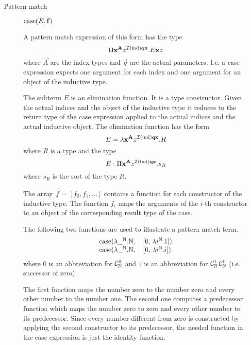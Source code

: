 \begin{description}
\item[Pattern match]
    $\text{case}(E, \mathbf{f})$

    A pattern match expression of this form has the type
    $$
    \Pi
        \mathbf{x}^{\mathbf{A}}
        z^{{\cal I }(\text{ind})\mathbf{q}\mathbf{x}}
        . E \mathbf{x} z
    $$
    where $\vec{A}$ are the index types and $\vec{q}$ are the actual parameters.
    I.e. a case
    expression expects one argument for each index and one argument for an
    object of the inductive type.

    The subterm $E$ is an elimination function. It is a type constructor. Given
    the actual indices and the object of the inductive type it reduces to the
    return type of the case expression applied to the actual indices and the
    actual inductive object. The elimination function has the form
    $$
        E
        =
        \lambda \mathbf{x}^{\mathbf{A}} z^{{\cal I } (\text{ind}) \mathbf{q} \mathbf{x}}. R
    $$
    where $R$ is a type and the type
    $$
        E
        :
        \Pi \mathbf{x}^{\mathbf{A}} z^{{\cal I } (\text{ind}) \mathbf{q} \mathbf{x}}. s_R
    $$
    where $s_R$ is the sort of the type $R$.


    The array $\vec{f} = [f_0, f_1, \ldots]$ contains a function for each
    constructor of the inductive type. The function $f_i$ maps the arguments of
    the $i$-th constructor to an object of the corresponding result type of the
    case.

    The following two functions are used to illustrate a pattern match term.
    {\def\Nat{\mathbb{N}}
      $$
      \begin{array}{l}
          \case ( \lambda \_^\Nat. \Nat,\quad [ 0 ,\, \lambda i^\Nat. 1])

          \\

          \case (\lambda \_^\Nat. \Nat,\quad [ 0,\, \lambda i^\Nat. i])
      \end{array}
      $$
      where $0$ is an abbreviation for $\Constructor^0_\Nat$ and $1$ is an
      abbreviation for $\Constructor^1_\Nat\, \Constructor^0_\Nat$
      (i.e. successor of zero).
    }

    The first function maps the number zero to the number zero and every other
    number to the number one. The second one computes a predecessor function
    which maps the number zero to zero and every other number to its
    predecessor. Since every number different from zero is constructed by
    applying the second constructor to its predecessor, the needed function in
    the case expression is just the identity function.


\end{description}
